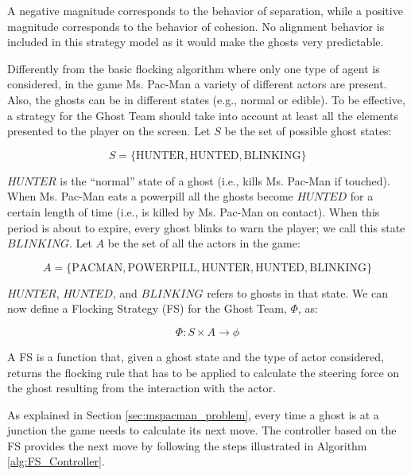 \documentclass[a4paper]{llncs}
\begin{document}

A negative magnitude corresponds to the behavior of separation, while a positive magnitude corresponds to the behavior of cohesion. No alignment behavior is included in this strategy model as it would make the ghosts very predictable.

Differently from the basic flocking algorithm where only one type of agent is considered, in the game Ms. Pac-Man a variety of different actors are present. Also, the ghosts can be in different states (e.g., normal or edible). To be effective, a strategy for the Ghost Team should take into account at least all the elements presented to the player on the screen. Let $S$ be the set of possible ghost states:
\begin{small}
\begin{equation}
S=\{\mathrm{HUNTER}, \mathrm{HUNTED}, \mathrm{BLINKING}\}
\end{equation}
\end{small}
$HUNTER$ is the ``normal'' state of a ghost (i.e., kills Ms. Pac-Man if touched). When Ms. Pac-Man eats a powerpill all the ghosts become $HUNTED$ for a certain length of time (i.e., is killed by Ms. Pac-Man on contact). When this period is about to expire, every ghost blinks to warn the player; we call this state $BLINKING$. Let $A$ be the set of all the actors in the game:
\begin{small}
$$A=\{\mathrm{PACMAN}, \mathrm{POWERPILL}, \mathrm{HUNTER}, \mathrm{HUNTED}, \mathrm{BLINKING}\}$$
\end{small}
$HUNTER$, $HUNTED$, and $BLINKING$ refers to ghosts in that state. We can now define a Flocking Strategy (FS) for the Ghost Team, $\Phi$, as:
\begin{small}
$$\Phi : S \times A \to \phi$$
\end{small}
A FS is a function that, given a ghost state and the type of actor considered, returns the flocking rule that has to be applied to calculate the steering force on the ghost resulting from the interaction with the actor.

As explained in Section \ref{sec:mspacman_problem}, every time a ghost is at a junction the game needs to calculate its next move. The controller based on the FS provides the next move by following the steps illustrated in Algorithm \ref{alg:FS_Controller}.
\end{document}

